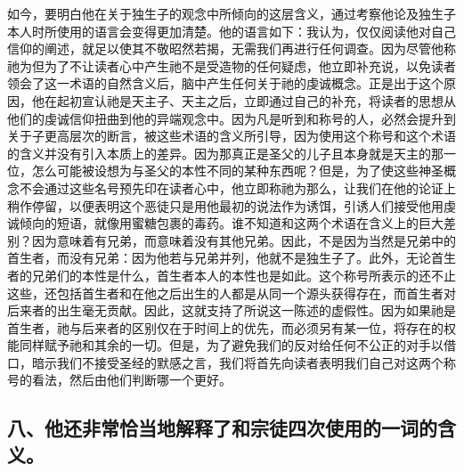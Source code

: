 如今，要明白他在关于独生子的观念中所倾向的这层含义，通过考察他论及独生子本人时所使用的语言会变得更加清楚。他的语言如下：我认为，仅仅阅读他对自己信仰的阐述，就足以使其不敬昭然若揭，无需我们再进行任何调查。因为尽管他称祂为但为了不让读者心中产生祂不是受造物的任何疑虑，他立即补充说，以免读者领会了这一术语的自然含义后，脑中产生任何关于祂的虔诚概念。正是出于这个原因，他在起初宣认祂是天主子、天主之后，立即通过自己的补充，将读者的思想从他们的虔诚信仰扭曲到他的异端观念中。因为凡是听到和称号的人，必然会提升到关于子更高层次的断言，被这些术语的含义所引导，因为使用这个称号和这个术语的含义并没有引入本质上的差异。因为那真正是圣父的儿子且本身就是天主的那一位，怎么可能被设想为与圣父的本性不同的某种东西呢？但是，为了使这些神圣概念不会通过这些名号预先印在读者心中，他立即称祂为那么，让我们在他的论证上稍作停留，以便表明这个恶徒只是用他最初的说法作为诱饵，引诱人们接受他用虔诚倾向的短语，就像用蜜糖包裹的毒药。谁不知道和这两个术语在含义上的巨大差别？因为意味着有兄弟，而意味着没有其他兄弟。因此，不是因为当然是兄弟中的首生者，而没有兄弟：因为他若与兄弟并列，他就不是独生子了。此外，无论首生者的兄弟们的本性是什么，首生者本人的本性也是如此。这个称号所表示的还不止这些，还包括首生者和在他之后出生的人都是从同一个源头获得存在，而首生者对后来者的出生毫无贡献。因此，这就支持了所说这一陈述的虚假性。因为如果祂是首生者，祂与后来者的区别仅在于时间上的优先，而必须另有某一位，将存在的权能同样赋予祂和其余的一切。但是，为了避免我们的反对给任何不公正的对手以借口，暗示我们不接受圣经的默感之言，我们将首先向读者表明我们自己对这两个称号的看法，然后由他们判断哪一个更好。\par


\subsection{八、他还非常恰当地解释了和宗徒四次使用的一词的含义。}

